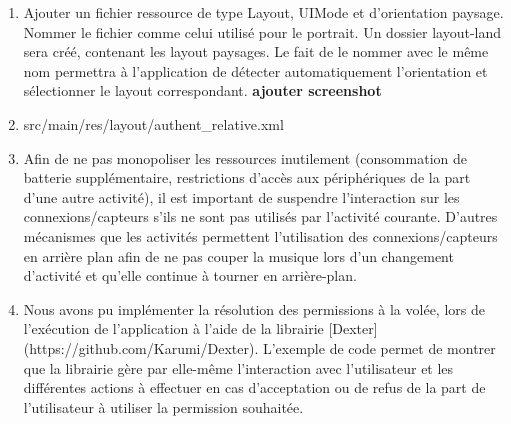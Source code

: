\documentclass[a4paper]{article}
\begin{document}
\begin{enumerate}
    \item Ajouter un fichier ressource de type Layout, UIMode et d'orientation paysage. Nommer le fichier comme celui utilisé pour le portrait. Un dossier layout-land sera créé, contenant les layout paysages. Le fait de le nommer avec le même nom permettra à l'application de détecter automatiquement l'orientation et sélectionner le layout correspondant. \textbf{ajouter screenshot}
    
    \item src/main/res/layout/authent\_relative.xml
    
    \item Afin de ne pas monopoliser les ressources inutilement (consommation de batterie supplémentaire, restrictions d'accès aux périphériques de la part d'une autre activité), il est important de suspendre l'interaction sur les connexions/capteurs s'ils ne sont pas utilisés par l'activité courante. D'autres mécanismes que les activités permettent l'utilisation des connexions/capteurs en arrière plan afin de ne pas couper la musique lors d'un changement d'activité et qu'elle continue à tourner en arrière-plan.
    
    \item Nous avons pu implémenter la résolution des permissions à la volée, lors de l'exécution de l'application à l'aide de la librairie [Dexter](https://github.com/Karumi/Dexter). L'exemple de code permet de montrer que la librairie gère par elle-même l'interaction avec l'utilisateur et les différentes actions à effectuer en cas d'acceptation ou de refus de la part de l'utilisateur à utiliser la permission souhaitée.
    
    
\end{enumerate}
\end{document}
